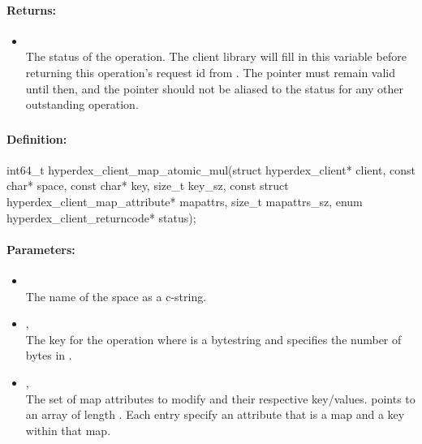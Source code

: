 \paragraph{Returns:}
\begin{itemize}[noitemsep]
\item {}\\
The status of the operation.  The client library will fill in this variable before returning this operation's request id from .  The pointer must remain valid until then, and the pointer should not be aliased to the status for any other outstanding operation.
\end{itemize}

\pagebreak
\subsubsection{}
\label{api:c:map_atomic_mul}


\paragraph{Definition:}
\begin{ccode}
int64_t hyperdex_client_map_atomic_mul(struct hyperdex_client* client,
        const char* space,
        const char* key, size_t key_sz,
        const struct hyperdex_client_map_attribute* mapattrs, size_t mapattrs_sz,
        enum hyperdex_client_returncode* status);
\end{ccode}

\paragraph{Parameters:}
\begin{itemize}[noitemsep]
\item {}\\
The name of the space as a c-string.
\item {}, \\
The key for the operation where  is a bytestring and  specifies the number of bytes in .
\item {}, \\
The set of map attributes to modify and their respective key/values.   points to an array of length .  Each entry specify an attribute that is a map and a key within that map.
\end{itemize}

